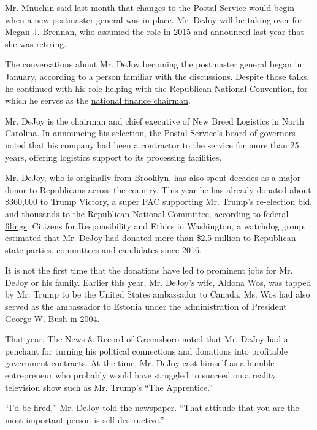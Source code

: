 Mr. Mnuchin said last month that changes to the Postal Service would
begin when a new postmaster general was in place. Mr. DeJoy will be
taking over for Megan J. Brennan, who assumed the role in 2015 and
announced last year that she was retiring.

The conversations about Mr. DeJoy becoming the postmaster general began
in January, according to a person familiar with the discussions. Despite
those talks, he continued with his role helping with the Republican
National Convention, for which he serves as the
\href{https://www.charlottein2020.com/charlotte-2020-host-committee-names-national-finance-chairman-louis-dejoy}{national
finance chairman}.

Mr. DeJoy is the chairman and chief executive of New Breed Logistics in
North Carolina. In announcing his selection, the Postal Service's board
of governors noted that his company had been a contractor to the service
for more than 25 years, offering logistics support to its processing
facilities.

Mr. DeJoy, who is originally from Brooklyn, has also spent decades as a
major donor to Republicans across the country. This year he has already
donated about \$360,000 to Trump Victory, a super PAC supporting Mr.
Trump's re-election bid, and thousands to the Republican National
Committee,
\href{https://www.fec.gov/data/receipts/individual-contributions/?committee_id=C00003418\&committee_id=C00580100\&committee_id=C00618371\&committee_id=C00618389\&contributor_name=louis+dejoy}{according
to federal filings}. Citizens for Responsibility and Ethics in
Washington, a watchdog group, estimated that Mr. DeJoy had donated more
than \$2.5 million to Republican state parties, committees and
candidates since 2016.

It is not the first time that the donations have led to prominent jobs
for Mr. DeJoy or his family. Earlier this year, Mr. DeJoy's wife, Aldona
Wos, was tapped by Mr. Trump to be the United States ambassador to
Canada. Ms. Wos had also served as the ambassador to Estonia under the
administration of President George W. Bush in 2004.

That year, The News \& Record of Greensboro noted that Mr. DeJoy had a
penchant for turning his political connections and donations into
profitable government contracts. At the time, Mr. DeJoy cast himself as
a humble entrepreneur who probably would have struggled to succeed on a
reality television show such as Mr. Trump's ``The Apprentice.''

``I'd be fired,''
\href{https://www.greensboro.com/business/new-breed-ceo-no-one-s-apprentice/article_ab0f9da6-b94f-5afc-8bc7-3e7b482028ef.html}{Mr.
DeJoy told the newspaper}. ``That attitude that you are the most
important person is self-destructive.''

